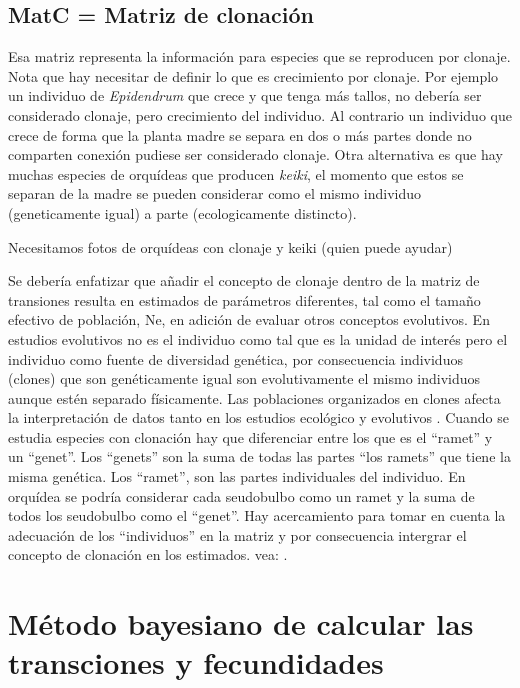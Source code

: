 \documentclass[
]{book}
\theoremstyle{definition}
\theoremstyle{definition}
\theoremstyle{definition}
\theoremstyle{definition}
\theoremstyle{remark}
\begin{document}
\section{MatC = Matriz de clonación}\label{matc-matriz-de-clonaciuxf3n}

Esa matriz representa la información para especies que se reproducen por clonaje. Nota que hay necesitar de definir lo que es crecimiento por clonaje. Por ejemplo un individuo de \emph{Epidendrum} que crece y que tenga más tallos, no debería ser considerado clonaje, pero crecimiento del individuo. Al contrario un individuo que crece de forma que la planta madre se separa en dos o más partes donde no comparten conexión pudiese ser considerado clonaje. Otra alternativa es que hay muchas especies de orquídeas que producen \emph{keiki}, el momento que estos se separan de la madre se pueden considerar como el mismo individuo (geneticamente igual) a parte (ecologicamente distincto).

Necesitamos fotos de orquídeas con clonaje y keiki (quien puede ayudar)

Se debería enfatizar que añadir el concepto de clonaje dentro de la matriz de transiones resulta en estimados de parámetros diferentes, tal como el tamaño efectivo de población, Ne, en adición de evaluar otros conceptos evolutivos. En estudios evolutivos no es el individuo como tal que es la unidad de interés pero el individuo como fuente de diversidad genética, por consecuencia individuos (clones) que son genéticamente igual son evolutivamente el mismo individuos aunque estén separado físicamente. Las poblaciones organizados en clones afecta la interpretación de datos tanto en los estudios ecológico y evolutivos \citet{cook1983clonal}. Cuando se estudia especies con clonación hay que diferenciar entre los que es el ``ramet'' y un ``genet''. Los ``genets'' son la suma de todas las partes ``los ramets'' que tiene la misma genética. Los ``ramet'', son las partes individuales del individuo. En orquídea se podría considerar cada seudobulbo como un ramet y la suma de todos los seudobulbo como el ``genet''. Hay acercamiento para tomar en cuenta la adecuación de los ``individuos'' en la matriz y por consecuencia intergrar el concepto de clonación en los estimados. vea: \citet{mcgraw1996estimation}.

\chapter{Método bayesiano de calcular las transciones y fecundidades}\label{muxe9todo-bayesiano-de-calcular-las-transciones-y-fecundidades}
\end{document}
